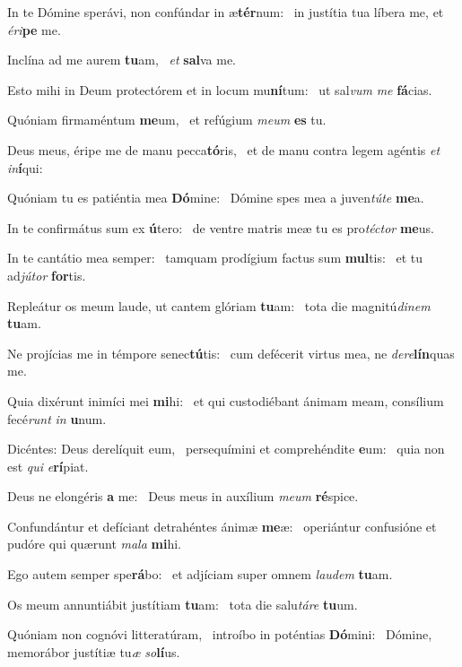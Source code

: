 \item In te Dómine sperávi, non confúndar in æ\textbf{tér}num:~\psstar{} in justítia tua líbera me, et \textit{éri}\textbf{pe} me.
\item Inclína ad me aurem \textbf{tu}am,~\psstar{} \textit{et} \textbf{sal}va me.
\item Esto mihi in Deum protectórem et in locum mu\textbf{ní}tum:~\psstar{} ut sal\textit{vum} \textit{me} \textbf{fá}cias.
\item Quóniam firmaméntum \textbf{me}um,~\psstar{} et refúgium \textit{meum} \textbf{es} tu.
\item Deus meus, éripe me de manu pecca\textbf{tó}ris,~\psstar{} et de manu contra legem agéntis \textit{et} \textit{in}\textbf{í}qui:
\item Quóniam tu es patiéntia mea \textbf{Dó}mine:~\psstar{} Dómine spes mea a juven\textit{túte} \textbf{me}a.
\item In te confirmátus sum ex \textbf{ú}tero:~\psstar{} de ventre matris meæ tu es pro\textit{téctor} \textbf{me}us.
\item In te cantátio mea semper:~\pscross{} tamquam prodígium factus sum \textbf{mul}tis:~\psstar{} et tu ad\textit{jútor} \textbf{for}tis.
\item Repleátur os meum laude, ut cantem glóriam \textbf{tu}am:~\psstar{} tota die magnitú\textit{dinem} \textbf{tu}am.
\item Ne projícias me in témpore senec\textbf{tú}tis:~\psstar{} cum defécerit virtus mea, ne \textit{dere}\textbf{lín}quas me.
\item Quia dixérunt inimíci mei \textbf{mi}hi:~\psstar{} et qui custodiébant ánimam meam, consílium fecé\textit{runt} \textit{in} \textbf{u}num.
\item Dicéntes: Deus derelíquit eum,~\pscross{} persequímini et comprehéndite \textbf{e}um:~\psstar{} quia non est \textit{qui} \textit{e}\textbf{rí}piat.
\item Deus ne elongéris \textbf{a} me:~\psstar{} Deus meus in auxílium \textit{meum} \textbf{ré}spice.
\item Confundántur et defíciant detrahéntes ánimæ \textbf{me}æ:~\psstar{} operiántur confusióne et pudóre qui quærunt \textit{mala} \textbf{mi}hi.
\item Ego autem semper spe\textbf{rá}bo:~\psstar{} et adjíciam super omnem \textit{laudem} \textbf{tu}am.
\item Os meum annuntiábit justítiam \textbf{tu}am:~\psstar{} tota die salu\textit{táre} \textbf{tu}um.
\item Quóniam non cognóvi litteratúram,~\pscross{} introíbo in poténtias \textbf{Dó}mini:~\psstar{} Dómine, memorábor justítiæ tu\textit{æ} \textit{so}\textbf{lí}us.
